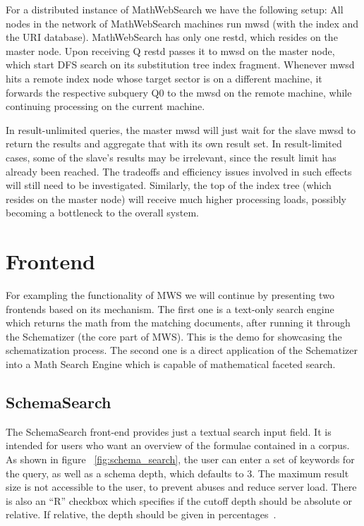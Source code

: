 \documentclass{deliverablereport}
\begin{document}
For a distributed instance of MathWebSearch we have the following setup: All nodes in the network of MathWebSearch machines run mwsd (with the index and the URI database). MathWebSearch has only one restd, which resides on the master node. Upon receiving Q restd passes it to mwsd on the master node, which start DFS search on its substitution tree index fragment. Whenever mwsd hits a remote index node whose target sector is on a different machine, it forwards the respective subquery Q0 to the mwsd on the remote machine, while continuing processing on the current machine. 

In result-unlimited queries, the master mwsd will just wait for the slave mwsd to return the results and aggregate that with its own result set. In result-limited cases, some of the slave’s results may be irrelevant, since the result limit has already been reached. The tradeoffs and efficiency issues involved in such effects will still need to be investigated. Similarly, the top of the index tree (which resides on the master node) will receive much higher processing loads, possibly becoming a bottleneck to the overall system. 


\section{Frontend}\label{frontend}
For exampling the functionality of MWS we will continue by presenting two frontends based
on its mechanism. The first one is a text-only search engine which returns the math from
the matching documents, after running it through the Schematizer (the core part of
MWS). This is the demo for showcasing the schematization process. The second one is a
direct application of the Schematizer into a Math Search Engine which is capable of
mathematical faceted search.~\cite{HamKoh:fsfm15}

\subsection{SchemaSearch}\label{shcemasearch}
The SchemaSearch front-end provides just a textual search input field. It is intended for
users who want an overview of the formulae contained in a corpus. As shown in figure
~\ref{fig:schema_search}, the user can enter a set of keywords for the query, as well as a
schema depth, which defaults to 3. The maximum result size is not accessible to the user,
to prevent abuses and reduce server load. There is also an “R” checkbox which specifies if
the cutoff depth should be absolute or relative. If relative, the depth should be given in
percentages~\cite{Ham:bcs15}.
\end{document}
